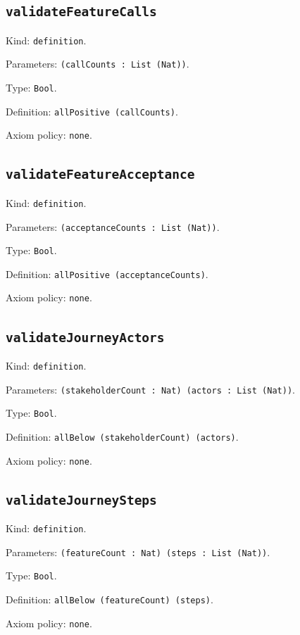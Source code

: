 \documentclass[11pt]{article}
\begin{document}
\subsection*{\texttt{validateFeatureCalls}}
\noindent Kind: \texttt{definition}.\par
\noindent Parameters: \texttt{(callCounts : List (Nat))}.\par
\noindent Type: \texttt{Bool}.\par
\noindent Definition: \texttt{allPositive (callCounts)}.\par
\noindent Axiom policy: \texttt{none}.\par
\subsection*{\texttt{validateFeatureAcceptance}}
\noindent Kind: \texttt{definition}.\par
\noindent Parameters: \texttt{(acceptanceCounts : List (Nat))}.\par
\noindent Type: \texttt{Bool}.\par
\noindent Definition: \texttt{allPositive (acceptanceCounts)}.\par
\noindent Axiom policy: \texttt{none}.\par
\subsection*{\texttt{validateJourneyActors}}
\noindent Kind: \texttt{definition}.\par
\noindent Parameters: \texttt{(stakeholderCount : Nat) (actors : List (Nat))}.\par
\noindent Type: \texttt{Bool}.\par
\noindent Definition: \texttt{allBelow (stakeholderCount) (actors)}.\par
\noindent Axiom policy: \texttt{none}.\par
\subsection*{\texttt{validateJourneySteps}}
\noindent Kind: \texttt{definition}.\par
\noindent Parameters: \texttt{(featureCount : Nat) (steps : List (Nat))}.\par
\noindent Type: \texttt{Bool}.\par
\noindent Definition: \texttt{allBelow (featureCount) (steps)}.\par
\noindent Axiom policy: \texttt{none}.\par
\end{document}
